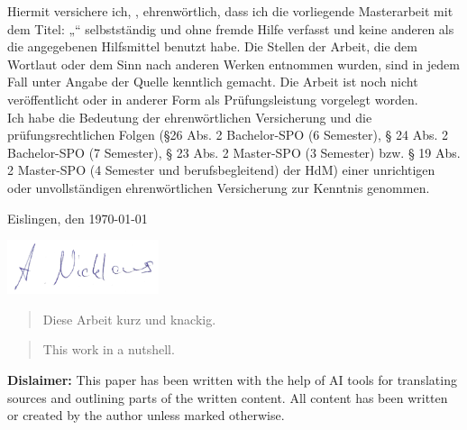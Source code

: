 \documentclass[a4paper, fontsize=11pt]{article}
\makeatletter
\let\Title\@title
\let\Author\@author
\makeatother
\begin{document}
	Hiermit versichere ich, \Author, ehrenwörtlich, dass ich die
	vorliegende Masterarbeit mit dem Titel: „\Title“ selbstständig und ohne fremde Hilfe verfasst und keine
	anderen als die angegebenen Hilfsmittel benutzt habe. Die Stellen der Arbeit, die dem
	Wortlaut oder dem Sinn nach anderen Werken entnommen wurden, sind in jedem Fall
	unter Angabe der Quelle kenntlich gemacht. Die Arbeit ist noch nicht veröffentlicht oder
	in anderer Form als Prüfungsleistung vorgelegt worden.\\
	
	Ich habe die Bedeutung der ehrenwörtlichen Versicherung und die prüfungsrechtlichen
	Folgen (§26 Abs. 2 Bachelor-SPO (6 Semester), § 24 Abs. 2 Bachelor-SPO (7 Semester), §
	23 Abs. 2 Master-SPO (3 Semester) bzw. § 19 Abs. 2 Master-SPO (4 Semester und
	berufsbegleitend) der HdM) einer unrichtigen oder unvollständigen ehrenwörtlichen
	Versicherung zur Kenntnis genommen.
	\vspace{30px}
	
	Eislingen, den \today
	\vspace{20px}
	
	\includegraphics[height=60px]{img/unterschrift.png}
	\vspace{10px}
	
	\Author

\pagebreak

\begin{abstract}
  Diese Arbeit kurz und knackig.
\end{abstract}

\begin{abstract}
  This work in a nutshell.
\end{abstract}

\vfill

\noindent\textbf{Dislaimer:} This paper has been written with the help of AI tools for translating sources and outlining parts of the written content.
All content has been written or created by the author unless marked otherwise.

\pagebreak

\tableofcontents
\pagebreak
\end{document}
